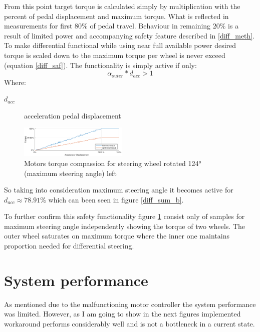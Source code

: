 From this point target torque is calculated simply by multiplication with the percent of pedal displacement and maximum torque. What is reflected in measurements for first $80\%$ of pedal travel. 
Behaviour in remaining $20\%$ is a result of limited power and accompanying safety feature described in \ref{diff_meth}. To make differential functional while using near full available power desired torque is scaled down to the maximum torque per wheel is never exceed (equation \ref{diff_saf}).
The functionality is simply active if only: \begin{equation*}
    \alpha_{outer} * d_{acc}>1
\end{equation*} 
Where:
\begin{description}
    \item[$d_{acc}$] acceleration pedal displacement
\end{description}

\begin{figure}
    \vspace{-20pt}
    \centering
    \includegraphics[width=0.46\textwidth]{figures/diff_123}
    \caption{Motors torque compassion for steering wheel rotated 124° (maximum steering angle) left}
    \label{diff_123}
    \vspace{-20pt}
\end{figure}
So taking into consideration maximum steering angle it becomes active for $d_{acc} \approx 78.91\%$ which can been seen in figure \ref{diff_sum_b}.

To further confirm this safety functionality figure \ref{diff_123} consist only of samples for maximum steering angle independently showing the torque of two wheels. The outer wheel saturates on maximum torque where the inner one maintains proportion needed for differential steering.

\section{System performance}
As mentioned due to the malfunctioning motor controller the system performance was limited. However, as I am going to show in the next figures implemented workaround performs considerably well and is not a bottleneck in a current state.

